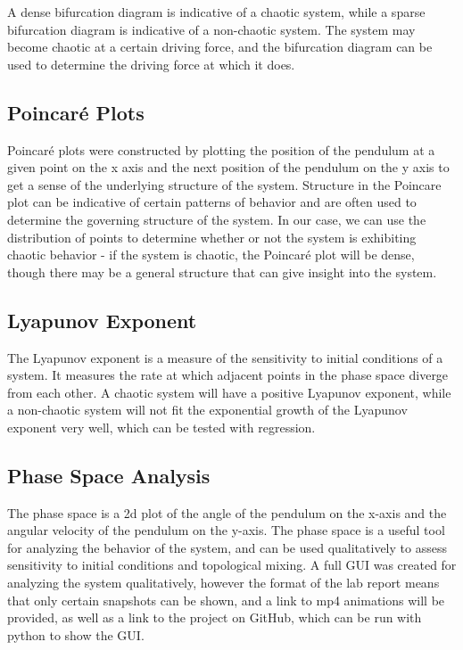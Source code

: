 \documentclass[11pt]{article} %
\begin{document}
        A dense bifurcation diagram is indicative of a chaotic system, while a sparse bifurcation diagram is indicative of a non-chaotic
        system. The system may become chaotic at a certain driving force, and the bifurcation diagram can be used to determine the
        driving force at which it does.\\
    \subsection{Poincar\'e Plots}
        Poincar\'e plots were constructed by plotting the position of the pendulum at a given point on the x axis and the next position of
        the pendulum on the y axis to get a sense of the underlying structure of the system. Structure in the Poincare plot can be indicative
        of certain patterns of behavior and are often used to determine the governing structure of the system. In our case, we can use the
        distribution of points to determine whether or not the system is exhibiting chaotic behavior - if the system is chaotic, the Poincar\'e
        plot will be dense, though there may be a general structure that can give insight into the system.\\
    \subsection{Lyapunov Exponent}
        The Lyapunov exponent is a measure of the sensitivity to initial conditions of a system. It measures the rate at which
        adjacent points in the phase space diverge from each other. A chaotic system will have a positive Lyapunov exponent, while
        a non-chaotic system will not fit the exponential growth of the Lyapunov exponent very well, which can be tested with regression.
    \subsection{Phase Space Analysis}
        The phase space is a 2d plot of the angle of the pendulum on the x-axis and the angular velocity of the pendulum on the y-axis. 
        The phase space is a useful tool for analyzing the behavior of the system, and can be used qualitatively to assess sensitivity 
        to initial conditions and topological mixing. A full GUI was created for analyzing the system qualitatively, however the format
        of the lab report means that only certain snapshots can be shown, and a link to mp4 animations will be provided, as well as a link
        to the project on GitHub, which can be run with python to show the GUI.\\
\end{document}
